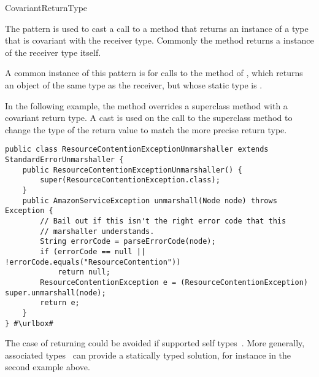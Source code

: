 \begin{pattern}{CovariantReturnType}

The \thisp{} pattern is used to cast a call to a method that returns
an instance of a type that is covariant with the 
receiver type.
Commonly the method returns a instance of the receiver type itself.

\instances{}
A common instance of this pattern is for calls to the 
 method of , which returns an object of the same type as the
receiver, but whose static type is .


In the following example,
the  method overrides a superclass method with a covariant return type.
A cast is used on the call to the superclass method 
to change the type of the return value to match the more precise return type.

\def\urlvar{http://bit.ly/aws_amplify_aws_sdk_android_2FVWl13}
\begin{verbatim}
public class ResourceContentionExceptionUnmarshaller extends StandardErrorUnmarshaller {
    public ResourceContentionExceptionUnmarshaller() {
        super(ResourceContentionException.class);
    }
    public AmazonServiceException unmarshall(Node node) throws Exception {
        // Bail out if this isn't the right error code that this
        // marshaller understands.
        String errorCode = parseErrorCode(node);
        if (errorCode == null || !errorCode.equals("ResourceContention"))
            return null;
        ResourceContentionException e = (ResourceContentionException) super.unmarshall(node);
        return e;
    }
} #\urlbox#
\end{verbatim}

\issues{}
  The case of returning  
                 could be avoided if \java{} supported self types~\cite{bruceChallengingTypingIssues2003}.
  More generally, associated types~\cite{chakravartyAssociatedTypeSynonyms2005}
  can provide a statically typed solution, for instance in the second example
  above.

\end{pattern}



